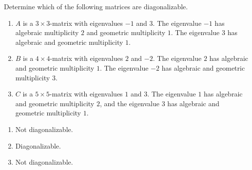 \documentclass{ximera}
\begin{document}
\begin{problem}
  Determine which of the following matrices are diagonalizable.
  \begin{enumerate}
  \item $A$ is a $3\times 3$-matrix with eigenvalues $-1$ and $3$. The
    eigenvalue $-1$ has algebraic multiplicity $2$ and geometric
    multiplicity $1$. The eigenvalue $3$ has algebraic and geometric
    multiplicity $1$.
  \item $B$ is a $4\times 4$-matrix with eigenvalues $2$ and $-2$. The
    eigenvalue $2$ has algebraic and geometric multiplicity $1$. The
    eigenvalue $-2$ has algebraic and geometric multiplicity $3$.
  \item $C$ is a $5\times 5$-matrix with eigenvalues $1$ and $3$. The
    eigenvalue $1$ has algebraic and geometric multiplicity $2$, and
    the eigenvalue $3$ has algebraic and geometric multiplicity $1$.
  \end{enumerate}
  \begin{solution}
    \begin{enumerate}
    \item Not diagonalizable.
    \item Diagonalizable.
    \item Not diagonalizable.
    \end{enumerate}
  \end{solution}
\end{problem}
\end{document}

